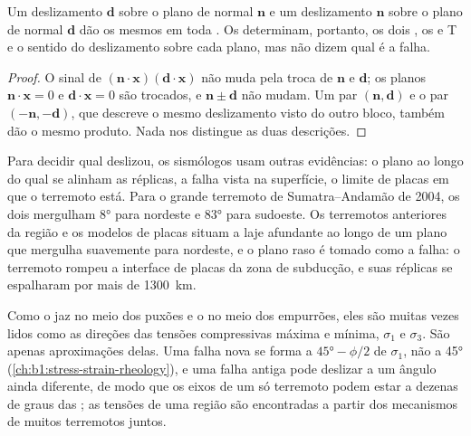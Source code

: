 \begin{proposition}\label{prop:b1:earthquake-source:auxiliary}
Um deslizamento $\mathbf d$ sobre o plano de normal $\mathbf n$ e um deslizamento $\mathbf n$ sobre o plano de normal $\mathbf d$ dão os mesmos  em toda . Os  determinam, portanto, os dois , os  e T e o sentido do deslizamento sobre cada plano, mas não dizem qual  é a falha.
\end{proposition}

\begin{proof}
O sinal de $(\mathbf n\cdot\mathbf x)(\mathbf d\cdot\mathbf x)$ não muda pela troca de $\mathbf n$ e $\mathbf d$; os planos $\mathbf n\cdot\mathbf x = 0$ e $\mathbf d\cdot\mathbf x = 0$ são trocados, e $\mathbf n \pm \mathbf d$ não mudam. Um par $(\mathbf n, \mathbf d)$ e o par $(-\mathbf n, -\mathbf d)$, que descreve o mesmo deslizamento visto do outro bloco, também dão o mesmo produto. Nada nos  distingue as duas descrições.
\end{proof}

Para decidir qual  deslizou, os sismólogos usam outras evidências: o plano ao longo do qual se alinham as réplicas, a falha vista na superfície, o limite de placas em que o terremoto está. Para o grande terremoto de Sumatra--Andamão de 2004, os dois  mergulham \ang{8} para nordeste e \ang{83} para sudoeste. Os terremotos anteriores da região e os modelos de placas situam a laje afundante ao longo de um plano que mergulha suavemente para nordeste, e o plano raso é tomado como a falha: o terremoto rompeu a interface de placas da zona de subducção, e suas réplicas se espalharam por mais de \qty{1300}{km}.

Como o  jaz no meio dos puxões e o  no meio dos empurrões, eles são muitas vezes lidos como as direções das tensões compressivas máxima e mínima, $\sigma_1$ e $\sigma_3$. São apenas aproximações delas. Uma falha nova se forma a $\ang{45} - \phi/2$ de $\sigma_1$, não a \ang{45} (\cref{ch:b1:stress-strain-rheology}), e uma falha antiga pode deslizar a um ângulo ainda diferente, de modo que os eixos de um só terremoto podem estar a dezenas de graus das ; as tensões de uma região são encontradas a partir dos mecanismos de muitos terremotos juntos.

